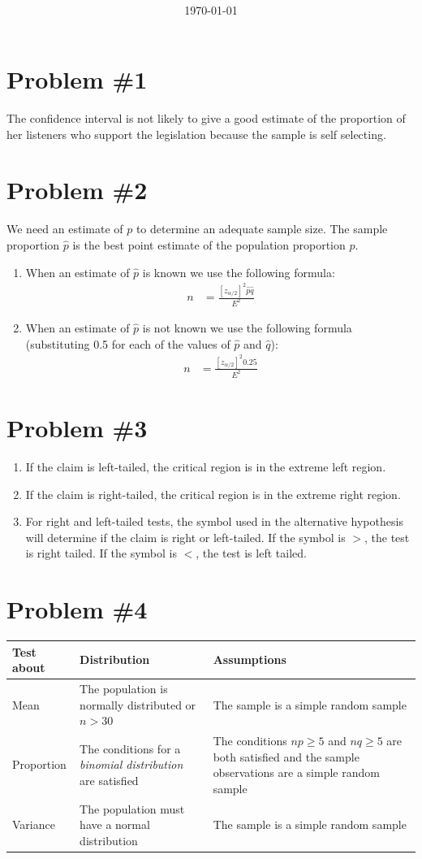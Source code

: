 \documentclass[12pt,fleqn]{article}
\title{\classdescription\ \\ \classname\ \\ $\ $ \\ \assignment}
\author{\authorname}
\date{\today}
\newcommand{\problem}[1]{\vspace{5ex}\section*{Problem \##1}}
\newcommand{\thead}[1]{\textnormal{\textbf{#1}}}
\begin{document}
\maketitle

\problem{1}
The confidence interval is not likely to give a good estimate of the proportion of her listeners who support the legislation because the sample is self selecting.


\problem{2}
We need an estimate of $p$ to determine an adequate sample size. The sample proportion ${\hat{p}}$ is the best point estimate of the population proportion $p$.
\begin{enumerate}
\item When an estimate of $\hat{p}$ is known we use the following formula:
  \begin{align*}
    n &= \frac{[z_{\alpha / 2}]^2 \hat{p} \hat{q}}{E^2}
  \end{align*}
\item When an estimate of $\hat{p}$ is not known we use the following formula (substituting 0.5 for each of the values of $\hat{p}$ and $\hat{q}$):
  \begin{align*}
    n &= \frac{[z_{\alpha / 2}]^2 0.25}{E^2}
  \end{align*}

\end{enumerate}


\problem{3}
\begin{enumerate}
\item If the claim is left-tailed, the critical region is in the extreme left region.
\item If the claim is right-tailed, the critical region is in the extreme right region.
\item For right and left-tailed tests, the symbol used in the alternative hypothesis will determine if the claim is right or left-tailed. If the symbol is $>$, the test is right tailed. If the symbol is $<$, the test is left tailed.
\end{enumerate}

\problem{4}
\begin{tabular}{@{}l p{6cm}  p{6cm} @{}}
  \thead{Test about} & \thead{Distribution} & \thead{Assumptions} \\
  \toprule
  Mean &
  The population is normally distributed or $n > 30$ &
  The sample is a simple random sample \\
  \midrule
  Proportion &
  The conditions for a \textit{binomial distribution} are satisfied &
  The conditions $np \ge 5$ and $nq \ge 5$ are both satisfied and the sample observations are a simple random sample \\
  \midrule
  Variance &
  The population must have a normal distribution &
  The sample is a simple random sample \\
  \bottomrule
\end{tabular}
\end{document}
